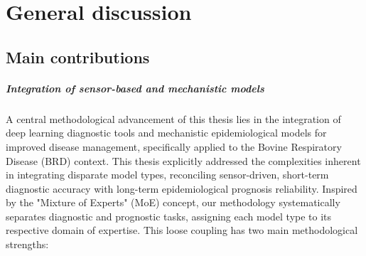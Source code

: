 
\chapter{General discussion} %

% 


\section{Main contributions}




\paragraph{Integration of sensor-based and mechanistic models} A central methodological advancement of this thesis lies in the integration of deep learning diagnostic tools and mechanistic epidemiological models for improved disease management, specifically applied to the Bovine Respiratory Disease (BRD) context. This thesis explicitly addressed the complexities inherent in integrating disparate model types, reconciling sensor-driven, short-term diagnostic accuracy with long-term epidemiological prognosis reliability. Inspired by the "Mixture of Experts" (MoE) concept, our methodology systematically separates diagnostic and prognostic tasks, assigning each model type to its respective domain of expertise. This loose coupling has two main methodological strengths:

